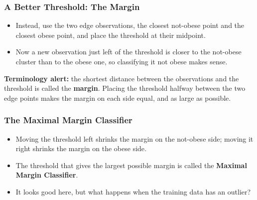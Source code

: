 \begin{frame}[fragile] \frametitle{A Better Threshold: The Margin}
\begin{itemize}
\item Instead, use the two edge observations, the closest not-obese point and the closest obese point, and place the threshold at their midpoint.
\item Now a new observation just left of the threshold is closer to the not-obese cluster than to the obese one, so classifying it not obese makes sense.
\end{itemize}
\begin{center}
\end{center}
\textbf{Terminology alert:} the shortest distance between the observations and the threshold is called the \textbf{margin}. Placing the threshold halfway between the two edge points makes the margin on each side equal, and as large as possible.
\end{frame}

\begin{frame}[fragile] \frametitle{The Maximal Margin Classifier}
\begin{itemize}
\item Moving the threshold left shrinks the margin on the not-obese side; moving it right shrinks the margin on the obese side.
\item The threshold that gives the largest possible margin is called the \textbf{Maximal Margin Classifier}.
\item It looks good here, but what happens when the training data has an outlier?
\end{itemize}
\end{frame}

